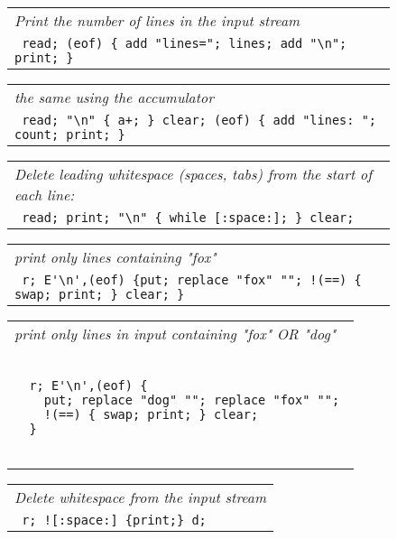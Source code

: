 \documentclass[a4paper,12pt]{article}
\begin{document}
 \begin{figure}
 \begin{tabular}{ l }
 \emph{ Print the number of lines in the input stream } \\ 
 \verb| read; (eof) { add "lines="; lines; add "\n"; print; } |
 \end{tabular} 
 \end{figure}
 \begin{figure}
 \begin{tabular}{ l }
 \emph{ the same using the accumulator } \\ 
 \verb| read; "\n" { a+; } clear; (eof) { add "lines: "; count; print; } |
 \end{tabular} 
 \end{figure}
 \begin{figure}
 \begin{tabular}{ l }
 \emph{ Delete leading whitespace (spaces, tabs) from the start of each line:  } \\ 
 \verb| read; print; "\n" { while [:space:]; } clear;  |
 \end{tabular} 
 \end{figure}
 \begin{figure}
 \begin{tabular}{ l }
 \emph{ print only lines containing "fox" } \\ 
 \verb| r; E'\n',(eof) {put; replace "fox" ""; !(==) { swap; print; } clear; } |
 \end{tabular} 
 \end{figure}
 \begin{figure}
 \begin{tabular}{ l }
 \emph{ print only lines in input containing "fox" OR "dog" } \\ 
 \begin{lstlisting}[breaklines] 

  r; E'\n',(eof) {
    put; replace "dog" ""; replace "fox" ""; 
    !(==) { swap; print; } clear; 
  }
 
 \end{lstlisting} 
 \end{tabular} 

 \end{figure}
 \begin{figure}
 \begin{tabular}{ l }
 \emph{ Delete whitespace from the input stream } \\ 
 \verb| r; ![:space:] {print;} d; |
 \end{tabular} 
 \end{figure}
\end{document}
